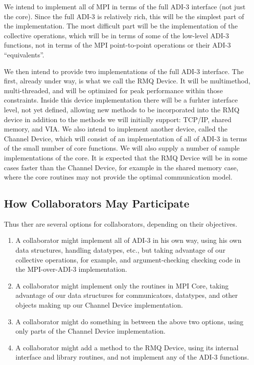\documentclass{article}
\begin{document}
We intend to implement all of MPI in terms of the full ADI-3 interface (not
just the core).  Since the full ADI-3 is relatively rich, this will be the
simplest part of the implementation.  The most difficult part will be the
implementation of the collective operations, which will be in terms of some of
the low-level ADI-3 functions, not in terms of the MPI point-to-point
operations or their ADI-3 ``equivalents''.

We then intend to provide two implementations of the full ADI-3 interface.
The first, already under way, is what we call the RMQ Device.  It will be 
multimethod, multi-threaded, and will be optimized for peak performance within
those constraints.  Inside this device implementation there will be a furhter
interface level, not yet defined, allowing new methods to be incorporated into
the RMQ device in addition to the methods we will initially support:  TCP/IP,
shared memory, and VIA.  We also intend to implement another device, called 
the Channel Device, which will consist of an implementation of all of ADI-3 in
terms of the small number of core functions.  We will also supply a number of
sample implementations of the core.  It is expected that the RMQ Device will
be in some cases faster than the Channel Device, for example in the shared
memory case, where the core routines may not provide the optimal communication
model. 


\subsection{How Collaborators May Participate}
\label{sec:collaborators}

Thus ther are several options for collaborators, depending on their
objectives.
\begin{enumerate}
\item A collaborator might implement all of ADI-3 in his own way, using his
  own data structures, handling datatypes, etc., but taking advantage of our
  collective operations, for example, and argument-checking checking code in
  the MPI-over-ADI-3 implementation.
\item A collaborator might implement only the routines in MPI Core, taking
  advantage of our data structures for communicators, datatypes, and other
  objects making up our Channel Device implementation.
\item A collaborator might do something in between the above two options,
  using only parts of the Channel Device implementation.
\item A collaborator might add a method to the RMQ Device, using its internal
  interface and library routines, and not implement any of the ADI-3 functions.
\end{enumerate}
\end{document}
